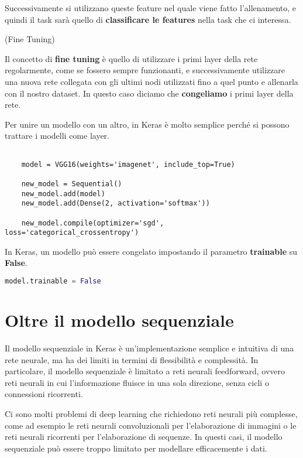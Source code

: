 Successivamente si utilizzano queste feature nel quale viene fatto
l'allenamento, e quindi il task sarà quello di \textbf{classificare le
    features} nella task che ci interessa.

\begin{definition}(Fine Tuning)
\end{definition}

Il concetto di \textbf{fine tuning} è quello di utilizzare i primi layer della
rete regolarmente, come se fossero sempre funzionanti, e successivamente
utilizzare una nuova rete collegata con gli ultimi nodi utilizzati fino a quel
punto e allenarla con il nostro dataset. In questo caso diciamo che
\textbf{congeliamo} i primi layer della rete.

Per unire un modello con un altro, in Keras è molto semplice perché si possono
trattare i modelli come layer.

\begin{lstlisting}

    model = VGG16(weights='imagenet', include_top=True)

    new_model = Sequential()
    new_model.add(model)
    new_model.add(Dense(2, activation='softmax'))

    new_model.compile(optimizer='sgd', loss='categorical_crossentropy')

\end{lstlisting}
In Keras, un modello può essere congelato impostando il parametro
\textbf{trainable} su \textbf{False}.

\begin{lstlisting}[language=Python]
    model.trainable = False
\end{lstlisting}

\newpage

\section{Oltre il modello sequenziale}

Il modello sequenziale in Keras è un'implementazione semplice e intuitiva di
una rete neurale, ma ha dei limiti in termini di flessibilità e complessità. In
particolare, il modello sequenziale è limitato a reti neurali feedforward,
ovvero reti neurali in cui l'informazione fluisce in una sola direzione, senza
cicli o connessioni ricorrenti.

Ci sono molti problemi di deep learning che richiedono reti neurali più
complesse, come ad esempio le reti neurali convoluzionali per l'elaborazione di
immagini o le reti neurali ricorrenti per l'elaborazione di sequenze. In questi
casi, il modello sequenziale può essere troppo limitato per modellare
efficacemente i dati.

